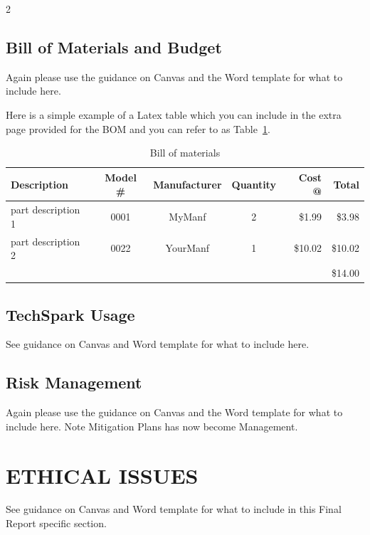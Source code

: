 \documentclass[10pt]{article}
\begin{document}
\begin{multicols*}{2}
\subsection{Bill of Materials and Budget} \label{budget}
Again please use the guidance on Canvas and the Word template for what to include here.

Here is a simple example of a Latex table which you can include in the extra page provided for the BOM and you can refer to as Table~\ref{budget-table}.
\begin{table} 
  \centering
  \caption{Bill of materials} \label{budget-table}
  \vspace{6 pt}
  \begin{tabular}{ l c c c r r }
     \hline
     Description & Model \# & Manufacturer & Quantity & Cost @ & Total \\ 
     \hline
     part description 1 & 0001 & MyManf & 2 & \$1.99 & \$3.98 \\  
     part description 2 & 0022 & YourManf & 1 & \$10.02 & \$10.02 \\  
     \hline
     &  &  &  &  & \$14.00 \\  
  \end{tabular}
\end{table}


\subsection{{\color{red}TechSpark Usage}}
{\color{red} See guidance on Canvas and Word template for what to include here.}

\subsection{Risk {\color{red}Management}}
Again please use the guidance on Canvas and the Word template for what to include here. {\color{red}Note Mitigation Plans has now become Management}.

\section{{\color{red}ETHICAL ISSUES}} \label{ethical-issues}
{\color{red}See guidance on Canvas and Word template for what to include in this Final Report specific section}.


\end{multicols*}
\end{document}
